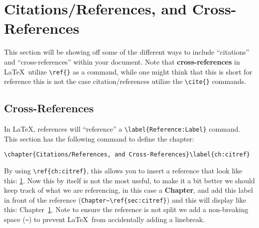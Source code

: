 \chapter{Citations/References, and Cross-References}\label{ch:citref}
	This section will be showing off some of the different ways to include \enquote{citations} and \enquote{cross-references} within your document.
	Note that \textbf{cross-references} in \LaTeX\ utilize \lstinline|\ref{}| as a command, while one might think that this is short for reference this is not the case citation/references utilize the \lstinline|\cite{}| commands.
	\section{Cross-References}
		In \LaTeX, references will \enquote{reference} a \lstinline|\label{Reference:Label}| command. 
		This section has the following command to define the chapter:
		\begin{Center}
			\lstinline|\chapter{Citations/References, and Cross-References}\label{ch:citref}|
		\end{Center}
		By using \lstinline|\ref{ch:citref}|, this allows you to insert a reference that look like this: \ref{ch:citref}.
		Now this by itself is not the most useful, to make it a bit better we should keep track of what we are referencing, in this case a \textbf{Chapter}, and add this label in front of the reference (\lstinline|Chapter~\ref{sec:citref}|) and this will display like this: Chapter~\ref{ch:citref}.
		Note to ensure the reference is not split we add a non-breaking space (\lstinline|~|) to prevent \LaTeX\ from accidentally adding a linebreak.

